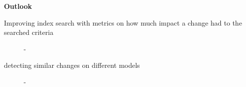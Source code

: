 

\textbf{ Outlook}
\begin{description}
  \item[Improving index search with metrics on how much impact a change had to the searched criteria] - 
  \item[detecting similar changes on different models] - 
\end{description} %


